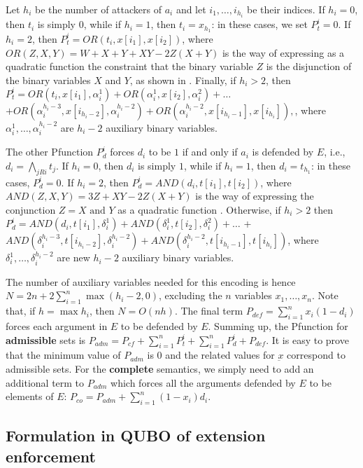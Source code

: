 \documentclass[conference,compsocconf]{IEEEtran}
\newcommand{\atts}{\ensuremath{R}\xspace}
\begin{document}
Let $h_i$ be the number of attackers of $a_i$ and let $i_1,\dots,i_{h_i}$ be
their indices. If $h_i=0$, then $t_i$ is simply $0$, while if $h_i=1$, then $t_i=x_{h_1}$:
in these cases, we set $P_{t}^i=0$.
If $h_i=2$, then $P_{t}^i=OR(t_i,x[i_1],x[i_2])$, where
$ OR(Z,X,Y)=W+X+Y+XY-2Z(X+Y)$
is the way of expressing as a quadratic function the constraint that the binary variable $Z$ is the disjunction of the binary variables $X$ and $Y$,
as shown in \cite{rosenberg}. Finally, if $h_i>2$, then
$ P_t^i=OR(t_i,x[i_1],\alpha_i^1)+OR(\alpha_i^1,x[i_2],\alpha_i^2)+\dots$
$ +OR(\alpha_i^{h_i-3},x[i_{h_i-2}],\alpha_i^{h_i-2})+
OR(\alpha_i^{h_i-2},x[i_{h_i-1}],x[i_{h_i}]), $, where $\alpha_i^1,\dots,\alpha_i^{h_i-2}$ are $h_i-2$ auxiliary binary variables.

The other Pfunction $P_{d}^i$ forces $d_i$ to be $1$ if and only if $a_i$ is defended by $E$, i.e.,
$ d_i = \bigwedge_{j \atts i} t_j $.
If $h_i=0$, then $d_i$ is simply $1$, while if $h_i=1$, then $d_i=t_{h_1}$:
in these cases, $P_{d}^i=0$.
If $h_i=2$, then $P_{d}^i=AND(d_i,t[i_1],t[i_2])$, where
$ AND(Z,X,Y)=3Z+XY-2Z(X+Y) $
is the way of expressing the conjunction $Z=X\mbox{ and }Y$ as a quadratic function 
\cite{rosenberg}. Otherwise, if $h_i>2$ then
$ P_d^i=AND(d_i,t[i_1],\delta_i^1)+AND(\delta_i^1,t[i_2],\delta_i^2)+\dots$
+$ AND(\delta_i^{h_i-3},t[i_{h_i-2}],\delta_i^{h_i-2})+AND(\delta_i^{h_i-2},t[i_{h_i-1}], t[i_{h_i}])$, where $\delta_i^1,\dots,\delta_i^{h_i-2}$ are new $h_i-2$ auxiliary binary variables.

The number of auxiliary variables needed for this encoding is hence $N=2n+2\sum_{i=1}^n \max(h_i-2,0)$, excluding the $n$ variables $x_1,\dots,x_n$. 
Note that, if $h=\max h_i$, then $N=O(nh)$.
The final term $ P_{def}= \sum_{i=1}^n x_i(1-d_i) $
forces each argument in $E$ to be defended by $E$.
Summing up, the Pfunction for \textbf{admissible} sets is
$ P_{adm}=P_{cf}+ \sum_{i=1}^n P_t^i + \sum_{i=1}^n P_d^i 
+ P_{def}$.
It is easy to prove that the minimum value of $P_{adm}$ is $0$ and the related values for $\underbar{x}$ correspond to admissible sets. For the \textbf{complete} semantics, we simply need to add an additional term to $P_{adm}$
which forces all the arguments defended by $E$ to be elements of $E$:
$ P_{co}=P_{adm} + \sum_{i=1}^n (1-x_i)d_i$.

\subsection{Formulation in QUBO of extension enforcement}
\end{document}

